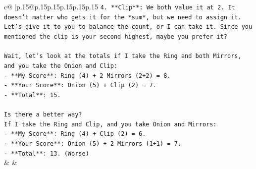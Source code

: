 \documentclass{article}
\begin{document}
{\begin{supertabular}{c@{$\;$}|p{.15\linewidth}@{}p{.15\linewidth}p{.15\linewidth}p{.15\linewidth}p{.15\linewidth}p{.15\linewidth}}
{{{\texttt{4. **Clip**: We both value it at 2. It doesn't matter who gets it for the *sum*, but we need to assign it. Let's give it to you to balance the count, or I can take it. Since you mentioned the clip is your second highest, maybe you prefer it?} \\
\\ 
\texttt{Wait, let's look at the totals if I take the Ring and both Mirrors, and you take the Onion and Clip:} \\
\texttt{{-} **My Score**: Ring (4) + 2 Mirrors (2+2) = 8.} \\
\texttt{{-} **Your Score**: Onion (5) + Clip (2) = 7.} \\
\texttt{{-} **Total**: 15.} \\
\\ 
\texttt{Is there a better way?} \\
\texttt{If I take the Ring and Clip, and you take Onion and Mirrors:} \\
\texttt{{-} **My Score**: Ring (4) + Clip (2) = 6.} \\
\texttt{{-} **Your Score**: Onion (5) + 2 Mirrors (1+1) = 7.} \\
\texttt{{-} **Total**: 13. (Worse)} \\
            }
        }
    }
    & & \\ \\


\end{supertabular}}
\end{document}
